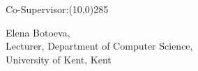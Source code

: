\vfill
\normalsize
Co-Supervisor:\line(10,0){285}
\vspace{-0.50cm}
\begin{center}\normalsize
Elena Botoeva, \\
Lecturer, Department of Computer Science,\\
University of Kent, Kent
\end{center}


\vfill
\vfill



